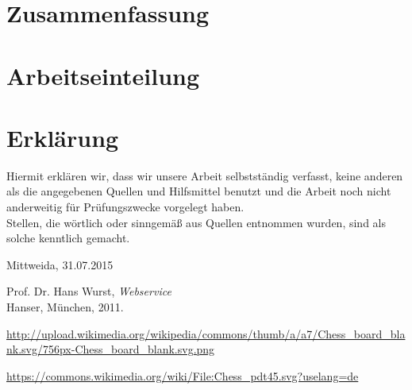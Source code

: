 \documentclass[12pt, a4paper, headings]{scrreprt}
\theoremstyle{definition}
\begin{document}
\chapter{Zusammenfassung}





\chapter{Arbeitseinteilung}



\chapter*{Erklärung}
\vspace{1.5cm}
Hiermit erklären wir, dass wir unsere Arbeit selbstständig verfasst, keine anderen als die
angegebenen Quellen und Hilfsmittel benutzt und die Arbeit noch nicht anderweitig für
Prüfungszwecke vorgelegt haben.\\ \newline
Stellen, die wörtlich oder sinngemäß aus Quellen entnommen wurden, sind als solche
kenntlich gemacht.\\ \vspace{2.5cm}



Mittweida, 31.07.2015


\listoffigures
\listoftables
\newpage
\begin{thebibliography}{99}
	
	  Prof. Dr. Hans Wurst, 
	  \emph{Webservice}\\
	  Hanser, München,  
	  2011.
	  
	 \url{http://upload.wikimedia.org/wikipedia/commons/thumb/a/a7/Chess_board_blank.svg/756px-Chess_board_blank.svg.png}
	
	\url{https://commons.wikimedia.org/wiki/File:Chess\_pdt45.svg?uselang=de}
	
\end{thebibliography}
\end{document}
